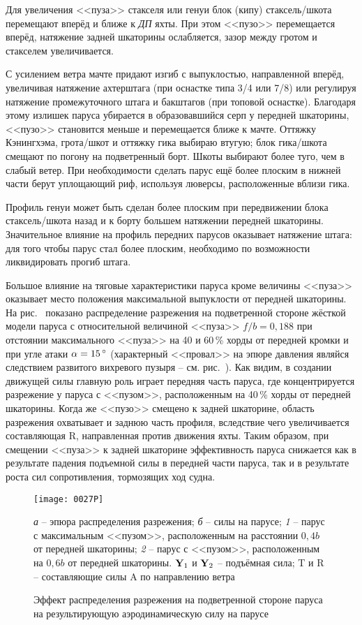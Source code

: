 Для увеличения <<пуза>> стакселя или генуи блок (кипу)
стаксель\-/шкота перемещают вперёд и ближе к \textit{ДП} яхты. При
этом <<пузо>> перемещается вперёд, натяжение задней шкаторины
ослабляется, зазор между гротом и стакселем увеличивается.

С усилением ветра мачте придают изгиб с выпуклостью, направленной
вперёд, увеличивая натяжение ахтерштага (при оснастке типа 3/4 или
7/8) или регулируя натяжение промежуточного штага и бакштагов (при
топовой оснастке). Благодаря этому излишек паруса убирается в
образовавшийся серп у передней шкаторины, <<пузо>> становится меньше и
перемещается ближе к мачте. Оттяжку Кэнингхэма, грота\-/шкот и оттяжку
гика выбираю втугую; блок гика\-/шкота смещают по погону на
подветренный борт. Шкоты выбирают более туго, чем в слабый ветер. При
необходимости сделать парус ещё более плоским в нижней части берут
уплощающий риф, используя люверсы, расположенные вблизи гика.

Профиль генуи может быть сделан более плоским при передвижении блока
стаксель\-/шкота назад и к борту большем натяжении передней
шкаторины. Значительное влияние на профиль передних парусов оказывает
натяжение штага: для того чтобы парус стал более плоским, необходимо
по возможности ликвидировать прогиб штага.

Большое влияние на тяговые характеристики паруса кроме величины
<<пуза>> оказывает место положения максимальной выпуклости от передней
шкаторины. На рис.~ показано распределение разрежения на
подветренной стороне жёсткой модели паруса с относительной величиной
<<пуза>> $f/b = 0,188$ при отстоянии максимального <<пуза>> на 40 и
60\,\% хорды от передней кромки и при угле атаки $\alpha = 15\,^\circ$
(характерный <<провал>> на эпюре давления являйся следствием развитого
вихревого пузыря \--- см. рис.~). Как видим, в создании
движущей силы главную роль играет передняя часть паруса, где
концентрируется разрежение у паруса с <<пузом>>, расположенным на
40\,\% хорды от передней шкаторины. Когда же <<пузо>> смещено к задней
шкаторине, область разрежения охватывает и заднюю часть профиля,
вследствие чего увеличивается составляющая \ve R, направленная против
движения яхты. Таким образом, при смещении <<пуза>> к задней шкаторине
эффективность паруса снижается как в результате падения подъемной силы
в передней части паруса, так и в результате роста сил сопротивления,
тормозящих ход судна.

\begin{figure}[htb]
  \centering
  \texttt{[image: 0027P]}
  \caption{Эффект распределения разрежения на подветренной стороне паруса на результирующую аэродинамическую силу на парусе}
  \label{fig:27}
  \small
  \centering{}
  \textit{а} \--- эпюра распределения разрежения; \textit{б} \--- силы на парусе; \textit{1} \--- парус с максимальным <<пузом>>, расположенным на расстоянии $0,4 b$ от передней шкаторины; \textit{2} \--- парус с <<пузом>>, расположенным на $0,6 b$ от передней шкаторины. $\mathbf{Y}_1$ и $\mathbf{Y}_2$ \--- подъёмная сила; \ve T и \ve R \--- составляющие силы \ve A по направлению ветра
\end{figure}

